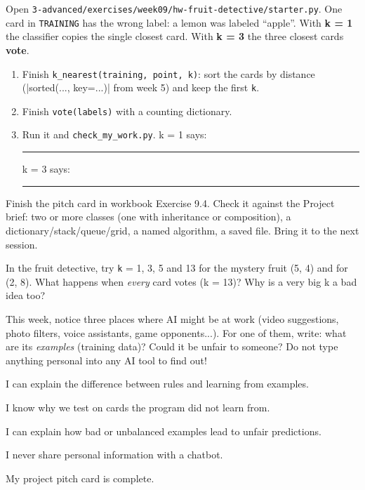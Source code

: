\namedateline

\begin{core}
Open \texttt{3-advanced/exercises/week09/hw-fruit-detective/starter.py}. One card in \texttt{TRAINING} has the wrong label: a lemon was labeled \enquote{apple}. With \textbf{k = 1} the classifier copies the single closest card. With \textbf{k = 3} the three closest cards \textbf{vote}.
\begin{enumerate}[itemsep=1pt]
  \item Finish \texttt{k\_nearest(training, point, k)}: sort the cards by distance (\py|sorted(..., key=...)| from week 5) and keep the first \texttt{k}.
  \item Finish \texttt{vote(labels)} with a counting dictionary.
  \item Run it and \texttt{check\_my\_work.py}. \quad k = 1 says: \rule{2cm}{0.4pt} \quad k = 3 says: \rule{2cm}{0.4pt}
\end{enumerate}
\end{core}

\begin{core}
Finish the pitch card in workbook Exercise 9.4. Check it against the Project brief: two or more classes (one with inheritance or composition), a dictionary/stack/queue/grid, a named algorithm, a saved file. Bring it to the next session.
\end{core}

\begin{challenge}
In the fruit detective, try \texttt{k} = 1, 3, 5 and 13 for the mystery fruit (5, 4) and for (2, 8). What happens when \emph{every} card votes (k = 13)? Why is a very big k a bad idea too?
\end{challenge}

\begin{creative}
This week, notice three places where AI might be at work (video suggestions, photo filters, voice assistants, game opponents...). For one of them, write: what are its \emph{examples} (training data)? Could it be unfair to someone? Do not type anything personal into any AI tool to find out!
\end{creative}

\begin{selfcheck}
  \item I can explain the difference between rules and learning from examples.
  \item I know why we test on cards the program did not learn from.
  \item I can explain how bad or unbalanced examples lead to unfair predictions.
  \item I never share personal information with a chatbot.
  \item My project pitch card is complete.
\end{selfcheck}
